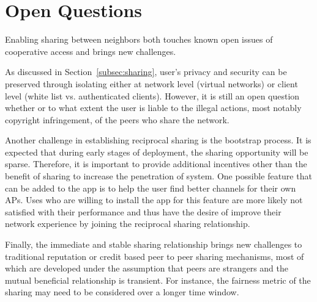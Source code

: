 \section{Open Questions}
\label{sec:challenges}

Enabling \wifi{} sharing between neighbors both touches known open issues of
cooperative \wifi{} access and brings new challenges.

As discussed in Section~\ref{subsec:sharing}, user's privacy and security can be
preserved through isolating either at network level (virtual networks) or client
level (white list vs. authenticated clients). However, it is still an open
question whether or to what extent the user is liable to the illegal
actions, most notably copyright infringement, of the peers who share the
network.

Another challenge in establishing reciprocal \wifi{} sharing is the bootstrap
process. It is expected that during early stages of deployment, the sharing
opportunity will be sparse. Therefore, it is important to provide additional
incentives other than the benefit of \wifi{} sharing to increase the penetration
of system. One possible feature that can be added to the \wisefi{} app is to
help the user find better \wifi{} channels for their own APs. Uses who are
willing to install the app for this feature are more likely not satisfied with
their \wifi{} performance and thus have the desire of improve their network
experience by joining the reciprocal sharing relationship.

Finally, the immediate and stable sharing relationship brings new challenges to
traditional reputation or credit based peer to peer sharing mechanisms, most of
which are developed under the assumption that peers are strangers and the mutual
beneficial relationship is transient. For instance, the fairness metric of the
sharing may need to be considered over a longer time window.
